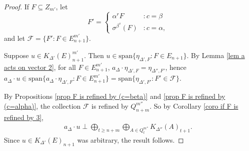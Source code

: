 \documentclass[12pt]{amsart}
\newcommand{\sse}{\subseteq}
\newcommand{\spn}{\text{span}}
\newcommand{\mc}[1]{\mathcal{#1}}
\newcommand{\al}{\alpha}
\newcommand{\be}{\beta}
\newcommand{\De}{\Delta}
\newcommand{\si}{\sigma}
\theoremstyle{plain} %
\theoremstyle{definition} %
\begin{document}
\begin{proof}
    If $F \sse Z_{m'}$, let $$F' = \begin{cases}
        \al^r F &: c = \be\\
        \si^{\be^s}(F) &: c = \al,
    \end{cases}$$
    and let $\mc{F} = \{ F' : F \in E_{n+1}^{m'}\}$.

    Suppose $u \in K_{\De'}(E)_{n+1}^{m'}$. Then $u \in \spn\{ \eta_{\De', F} : F \in E_{n+1}\}$. 
    By Lemma \ref{lem a acts on vector 2}, for all $F \in E_{n+1}^{m'}$, 
    $a_{\De} \cdot \eta_{\De', F} = \eta_{\De'', F'}$, hence $a_{\De} \cdot u \in \spn\{ a_{\De} \cdot \eta_{\De', F} : F \in E_{n+1}^{m'}\} = \spn\{ \eta_{\De', F'} : F' \in \mc{F}\}$. 

    By Propositions \ref{prop F is refined by (c=beta)} and \ref{prop F is refined by (c=alpha)}, the collection $\mc{F}$ is refined by $Q_{n+m}^{m''}$. So by Corollary \ref{coro if F is refined by 3}, 
    \begin{align*}
        a_{\De} \cdot u \perp \bigoplus_{t \ge n+m} \bigoplus_{A \in Q_t^{m''}} K_{\De''}(A)_{t+1}.
    \end{align*}
    Since $u \in K_{\De'}(E)_{n+1}$ was arbitrary, the result follows.
\end{proof}
\end{document}
